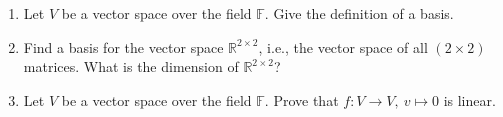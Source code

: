 \vspace*{-0.5cm}
\begin{enumerate}
		\item Let $V$ be a vector space over the field $\mathbb{F}$. Give the definition of a basis.
	\item Find a basis for the vector space $\mathbb{R}^{2 \times 2}$, i.e., the vector space of all $(2 \times 2)$ matrices. What is the dimension of $\mathbb{R}^{2 \times 2}$?
	\item Let $V$ be a vector space over the field $\mathbb{F}$. Prove that $f\colon V \to V,~v\mapsto 0$ is linear.
\end{enumerate}
 